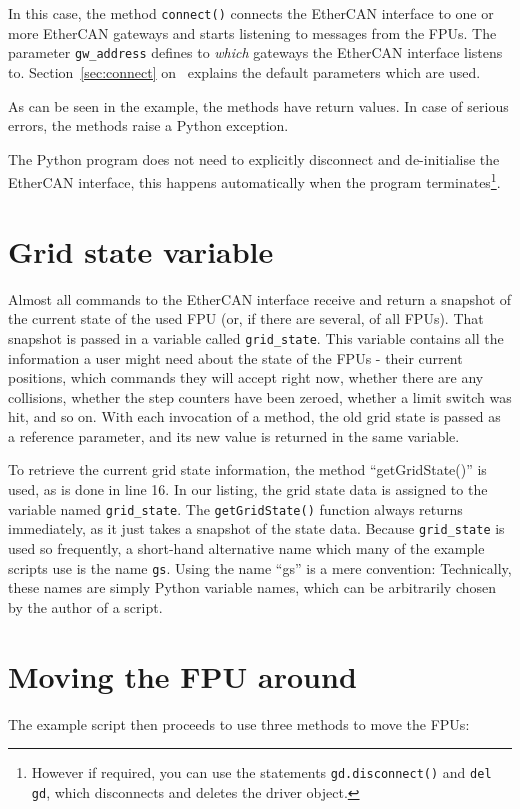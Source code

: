 \documentclass[fontsize=12,a4paper]{scrreprt}
\begin{document}
In this case, the method \texttt{connect()} connects the EtherCAN interface to one
or more EtherCAN gateways and starts listening to messages from the
FPUs. The parameter \texttt{gw\_address} defines to \emph{which}
gateways the EtherCAN interface listens to. Section~\ref{sec:connect}
on~\pageref{sec:connect} explains the default parameters which are
used.

As can be seen in the example, the methods have return values.  In
case of serious errors, the methods raise a Python exception.

The Python program does not need to explicitly disconnect and
de-initialise the EtherCAN interface, this happens automatically when the program
terminates\footnote{However if required, you can use the statements
  \texttt{gd.disconnect()} and \texttt{del gd}, which disconnects and
  deletes the driver object.}.



\section{Grid state variable}
 Almost all commands to the EtherCAN interface
receive and return a snapshot of the current state of the used FPU
(or, if there are several, of all FPUs). That snapshot is passed in a
variable called \texttt{grid\_state}. This variable contains all the
information a user might need about the state of the FPUs - their
current positions, which commands they will accept right now, whether
there are any collisions, whether the step counters have been zeroed,
whether a limit switch was hit, and so on. With each invocation of a
method, the old grid state is passed as a reference parameter, and its
new value is returned in the same variable.

To retrieve the current grid state information, the method
``getGridState()'' is used, as is done in line 16. In our listing, the
grid state data is assigned to the variable named
\texttt{grid\_state}.  The \texttt{getGridState()} function always
returns immediately, as it just takes a snapshot of the state
data. Because \texttt{grid\_state} is used so frequently, a short-hand
alternative name which many of the example scripts use is the name
\texttt{gs}.  Using the name ``gs'' is a mere convention: Technically,
these names are simply Python variable names, which can be arbitrarily
chosen by the author of a script.

\section{Moving the FPU around}
The example script then proceeds to use three methods to move
the FPUs:
\end{document}
